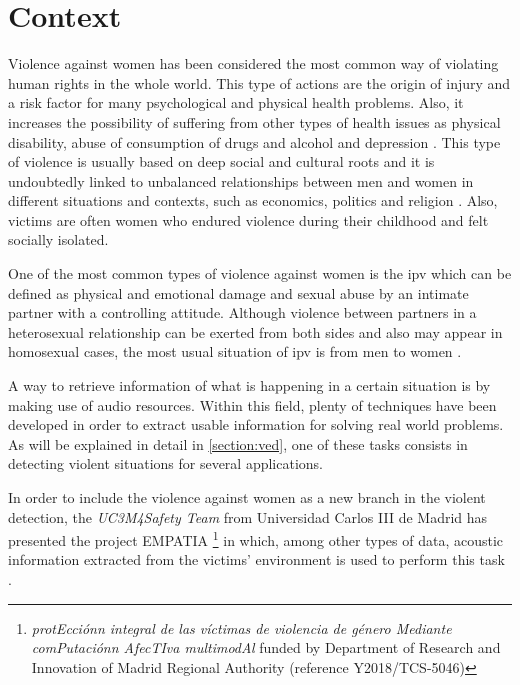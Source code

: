 \section{Context}

	Violence against women has been considered the most common way of violating human rights in the whole world. This type of actions are the origin of injury and a risk factor for many psychological and physical health problems. Also, it increases the possibility of suffering from other types of health issues as physical disability, abuse of consumption of drugs and alcohol and depression \cite{Heise1999}\cite{Watts2002}. This type of violence is usually based on deep social and cultural roots and it is undoubtedly linked to unbalanced relationships between men and women in different situations and contexts, such as economics, politics and religion \cite{Blanco2004}. Also, victims are often women who endured violence during their childhood and felt socially isolated. %
	
	One of the most common types of violence against women is the \acrfull{ipv} which can be defined as physical and emotional damage and sexual abuse by an intimate partner with a controlling attitude. Although violence between partners in a heterosexual relationship can be exerted from both sides and also may appear in homosexual cases, the most usual situation of \acrshort{ipv} is from men to women \cite{WorldHealtOrganization2012}.

	A way to retrieve information of what is happening in a certain situation is by making use of audio resources. Within this field, plenty of techniques have been developed in order to extract usable information for solving real world problems. As will be explained in detail in \ref{section:ved}, one of these tasks consists in detecting violent situations for several applications.
	
	In order to include the violence against women as a new branch in the violent detection, the \textit{UC3M4Safety Team} from Universidad Carlos III de Madrid has presented the project EMPATIA \footnote{\textit{protEcciónn integral de las víctimas de violencia de género Mediante comPutaciónn AfecTIva multimodAl} funded by Department  of  Research  and Innovation of Madrid Regional Authority (reference  Y2018/TCS-5046)} in which, among other types of data, acoustic information extracted from the victims' environment is used to perform this task \cite{UC3M4SafetyTeam2018}.

